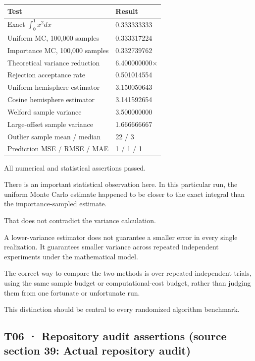 {\def\LTcaptype{none} %
\begin{longtable}[]{@{}ll@{}}
\toprule\noalign{}
Test & Result \\
\midrule\noalign{}
\endhead
\bottomrule\noalign{}
\endlastfoot
Exact \(\int_0^1x^2dx\) & 0.333333333 \\
Uniform MC, 100,000 samples & 0.333317224 \\
Importance MC, 100,000 samples & 0.332739762 \\
Theoretical variance reduction & 6.400000000× \\
Rejection acceptance rate & 0.501014554 \\
Uniform hemisphere estimator & 3.150050643 \\
Cosine hemisphere estimator & 3.141592654 \\
Welford sample variance & 3.500000000 \\
Large-offset sample variance & 1.666666667 \\
Outlier sample mean / median & 22 / 3 \\
Prediction MSE / RMSE / MAE & 1 / 1 / 1 \\
\end{longtable}
}

All numerical and statistical assertions passed.

There is an important statistical observation here. In this particular run, the uniform Monte Carlo estimate happened to be closer to the exact integral than the importance-sampled estimate.

That does not contradict the variance calculation.

A lower-variance estimator does not guarantee a smaller error in every single realization. It guarantees smaller variance across repeated independent experiments under the mathematical model.

The correct way to compare the two methods is over repeated independent trials, using the same sample budget or computational-cost budget, rather than judging them from one fortunate or unfortunate run.

This distinction should be central to every randomized algorithm benchmark.

\subsection{T06 · Repository audit assertions (source section 39: Actual repository audit)}\label{02-foundations-ii-ch039-t06-repository-audit-assertions-source-section-39-actual-repository-audit}

